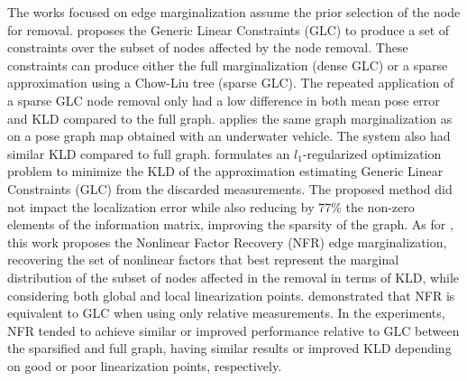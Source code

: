The works focused on edge marginalization assume the prior selection of the node for removal.
\cite{carlevaris-bianco-et-al:2014:2347571} proposes the Generic Linear Constraints (GLC) to produce a set of constraints over the subset of nodes affected by the node removal. These constraints can produce either the full marginalization (dense GLC) or a sparse approximation using a Chow-Liu tree (sparse GLC). The repeated application of a sparse GLC node removal only had a low difference in both mean pose error and KLD compared to the full graph.
\cite{ozog-et-al:2016:21582} applies the same graph marginalization as \cite{carlevaris-bianco-et-al:2014:2347571} on a pose graph map obtained with an underwater vehicle. The system also had similar KLD compared to full graph.
\cite{huang-et-al:2013:6698835} formulates an $l_1$-regularized optimization problem to minimize the KLD of the approximation estimating Generic Linear Constraints (GLC) from the discarded measurements. The proposed method did not impact the localization error while also reducing by 77\% the non-zero elements of the information matrix, improving the sparsity of the graph.
As for \cite{mazuran-et-al:2016:0278364915581629}, this work proposes the Nonlinear Factor Recovery (NFR) edge marginalization, recovering the set of nonlinear factors that best represent the marginal distribution of the subset of nodes affected in the removal in terms of KLD, while considering both global and local linearization points. \cite{mazuran-et-al:2016:0278364915581629} demonstrated that NFR is equivalent to GLC when using only relative measurements. In the experiments, NFR tended to achieve similar or improved performance relative to GLC between the sparsified and full graph, having similar results or improved KLD depending on good or poor linearization points, respectively.

